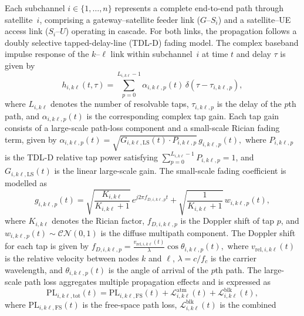 \documentclass[journal]{IEEEtran}
\begin{document}
Each subchannel $i \in \{1,\ldots,n\}$ represents a complete end-to-end path through satellite~$i$, comprising a gateway--satellite feeder link ($G$--$S_i$) and a satellite--UE access link ($S_i$--$U$) operating in cascade. For both links, the propagation follows a doubly selective  tapped-delay-line (TDL-D) fading model. The complex baseband impulse response of the $k$--$\ell$ link within subchannel~$i$ at time $t$ and delay $\tau$ is given by
\begin{equation}
h_{i,k\ell}(t,\tau) = \sum_{p=0}^{L_{i,k\ell}-1} \alpha_{i,k\ell,p}(t)\, \delta(\tau-\tau_{i,k\ell,p}),
\label{eq:ntn_impulse_response}
\end{equation}
where $L_{i,k\ell}$ denotes the number of resolvable taps, $\tau_{i,k\ell,p}$ is the delay of the $p$th path, and $\alpha_{i,k\ell,p}(t)$ is the corresponding complex tap gain. Each tap gain consists of a large-scale path-loss component and a  small-scale Rician fading term, given by
$ \alpha_{i,k\ell,p}(t) = \sqrt{G_{i,k\ell,\mathrm{LS}}(t) \cdot P_{i,k\ell,p}}\, g_{i,k\ell,p}(t),
$ where $P_{i,k\ell,p}$ is the TDL-D relative tap power satisfying 
$\sum_{p=0}^{L_{i,k\ell}-1} P_{i,k\ell,p} = 1$, and 
$G_{i,k\ell,\mathrm{LS}}(t)$ is the linear large-scale gain. The small-scale fading coefficient is modelled as
\begin{equation}
g_{i,k\ell,p}(t) = \sqrt{\frac{K_{i,k\ell}}{K_{i,k\ell}+1}}\, 
e^{j2\pi f_{D,i,k\ell,p}t} + \sqrt{\frac{1}{K_{i,k\ell}+1}}\, 
w_{i,k\ell,p}(t),
\label{eq:rician_fading}
\end{equation}
where $K_{i,k\ell}$ denotes the Rician factor, $f_{D,i,k\ell,p}$ 
is the Doppler shift of tap $p$, and 
$w_{i,k\ell,p}(t)\sim\mathcal{CN}(0,1)$ is the diffuse multipath 
component. The Doppler shift for each tap is given by
$ f_{D,i,k\ell,p} = \frac{v_{\mathrm{rel},i,k\ell}(t)}{\lambda} 
\cos\theta_{i,k\ell,p}(t),
$
where $v_{\mathrm{rel},i,k\ell}(t)$ is the relative velocity 
between nodes $k$ and $\ell$, $\lambda = c/f_c$ is the carrier 
wavelength, and $\theta_{i,k\ell,p}(t)$ is the angle of arrival 
of the $p$th path. The large-scale path loss aggregates multiple propagation effects  and is expressed as
\begin{equation}
\mathrm{PL}_{i,k\ell,\mathrm{tot}}(t) = \mathrm{PL}_{i,k\ell,\mathrm{FS}}(t) 
+ \mathcal{L}_{i,k\ell}^{\mathrm{atm}}(t) 
+ \mathcal{L}_{i,k\ell}^{\mathrm{blk}}(t),
\label{eq:total_path_loss}
\end{equation}
where $\mathrm{PL}_{i,k\ell,\mathrm{FS}}(t)$ is the free-space path 
loss, $\mathcal{L}_{i,k\ell}^{\mathrm{blk}}(t)$ is the combined 
\end{document}

